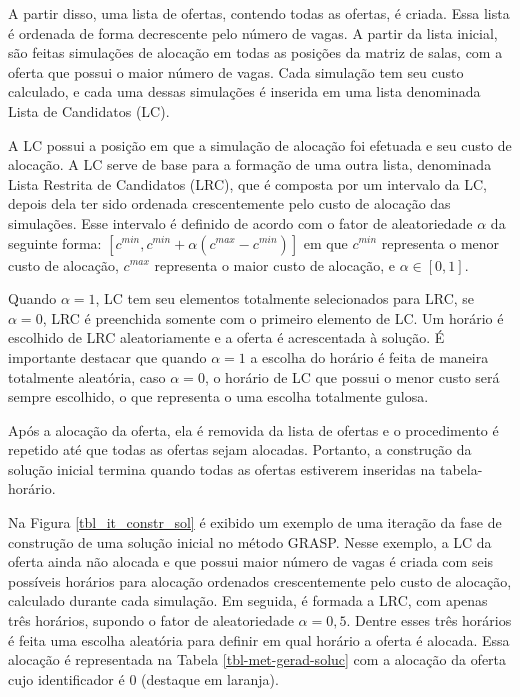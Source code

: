 A partir disso, uma lista de ofertas, contendo todas as ofertas, é criada. Essa lista é ordenada de forma decrescente pelo número de vagas. A partir da lista inicial, são feitas simulações de alocação em todas as posições da matriz de salas, com a oferta que possui o maior número de vagas. Cada simulação tem seu custo calculado, e cada uma dessas simulações é inserida em uma lista denominada Lista de Candidatos (LC).

A LC possui a posição em que a simulação de alocação foi efetuada e seu custo de alocação. A LC serve de base para a formação de uma outra lista, denominada Lista Restrita de Candidatos (LRC), que é composta por um intervalo da LC, depois dela ter sido ordenada crescentemente pelo custo de alocação das simulações. Esse intervalo é definido de acordo com o fator de aleatoriedade \(\alpha\) da seguinte forma: \([ c^{min}, c^{min} + \alpha(c^{max} - c^{min})]\) em que \(c^{min}\) representa o menor custo de alocação, \(c^{max}\) representa o maior custo de alocação, e \(\alpha \in [0,1]\).

Quando \(\alpha = 1\), LC tem seu elementos totalmente selecionados para LRC, se \(\alpha = 0\), LRC é preenchida somente com o primeiro elemento de LC. Um horário é escolhido de LRC aleatoriamente e a oferta é acrescentada à solução. É importante destacar que quando \(\alpha = 1\) a escolha do horário é feita de maneira totalmente aleatória, caso \(\alpha = 0\), o horário de LC que possui o menor custo será sempre escolhido, o que representa o uma escolha totalmente gulosa.

Após a alocação da oferta, ela é removida da lista de ofertas e o procedimento é repetido até que todas as ofertas sejam alocadas. Portanto, a construção da solução inicial termina quando todas as ofertas estiverem inseridas na tabela-horário.

Na Figura \ref{tbl_it_constr_sol} é exibido um exemplo de uma iteração da fase de construção de uma solução inicial no método GRASP. Nesse exemplo, a LC da oferta ainda não alocada e que possui maior número de vagas é criada com seis possíveis horários para alocação ordenados crescentemente pelo custo de alocação, calculado durante cada simulação. Em seguida, é formada a LRC, com apenas três horários, supondo o fator de aleatoriedade \(\alpha = 0,5\). Dentre esses três horários é feita uma escolha aleatória para definir em qual horário a oferta é alocada. Essa alocação é representada na Tabela \ref{tbl-met-gerad-soluc} com a alocação da oferta cujo identificador é 0 (destaque em laranja).


